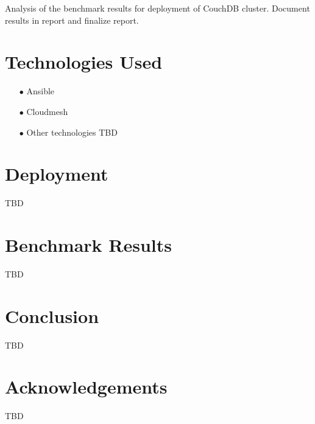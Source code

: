 \documentclass[9pt,twocolumn,twoside]{../../styles/osajnl}
\begin{document}
Analysis of the benchmark results for deployment of CouchDB
cluster. Document results in report and finalize report.

\section{Technologies Used}
\begin{itemize}
\item[$\bullet$] Ansible
\item[$\bullet$] Cloudmesh
\item[$\bullet$] Other technologies TBD
\end{itemize}

\section{Deployment}
TBD

\section{Benchmark Results}
TBD

\section{Conclusion}
TBD
\section*{Acknowledgements}

TBD





 
\end{document}
